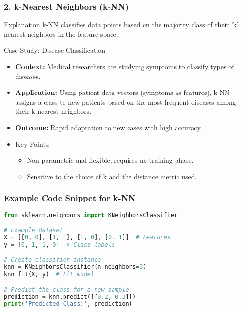 \documentclass[aspectratio=169]{beamer}
\begin{document}
\begin{frame}
    \frametitle{2. k-Nearest Neighbors (k-NN)}
    \begin{block}{Explanation}
        k-NN classifies data points based on the majority class of their 'k' nearest neighbors in the feature space.
    \end{block}

    \begin{block}{Case Study: Disease Classification}
        \begin{itemize}
            \item \textbf{Context:} Medical researchers are studying symptoms to classify types of diseases.
            \item \textbf{Application:} Using patient data vectors (symptoms as features), k-NN assigns a class to new patients based on the most frequent diseases among their k-nearest neighbors.
            \item \textbf{Outcome:} Rapid adaptation to new cases with high accuracy.
        \end{itemize}
    \end{block}

    \begin{itemize}
        \item Key Points:
        \begin{itemize}
            \item Non-parametric and flexible; requires no training phase.
            \item Sensitive to the choice of k and the distance metric used.
        \end{itemize}
    \end{itemize}
\end{frame}

\begin{frame}[fragile]
    \frametitle{Example Code Snippet for k-NN}
    \begin{lstlisting}[language=Python]
from sklearn.neighbors import KNeighborsClassifier

# Example dataset
X = [[0, 0], [1, 1], [1, 0], [0, 1]]  # Features
y = [0, 1, 1, 0]  # Class labels

# Create classifier instance
knn = KNeighborsClassifier(n_neighbors=3)
knn.fit(X, y)  # Fit model

# Predict the class for a new sample
prediction = knn.predict([[0.2, 0.3]])
print('Predicted Class:', prediction)
    \end{lstlisting}
\end{frame}
\end{document}
